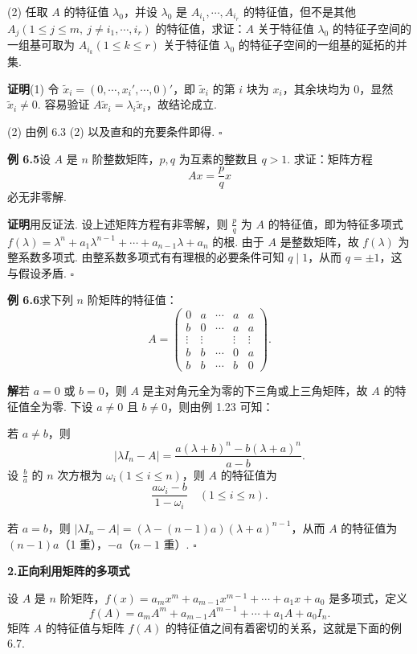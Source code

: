 \documentclass[UTF8,12pt,a4paper,fontset=fandol]{ctexart}
\begin{document}
(2) 任取 $A$ 的特征值 $\lambda_0$，并设 $\lambda_0$ 是 $A_{i_1},\cdots,A_{i_r}$ 的特征值，但不是其他 $A_j(1\le j\le m,\ j\ne i_1,\cdots,i_r)$ 的特征值，求证：$A$ 关于特征值 $\lambda_0$ 的特征子空间的一组基可取为 $A_{i_k}(1\le k\le r)$ 关于特征值 $\lambda_0$ 的特征子空间的一组基的延拓的并集.

\noindent\textbf{证明}\quad (1) 令 $\widetilde{x}_i=(0,\cdots,x_i',\cdots,0)'$，即 $\widetilde{x}_i$ 的第 $i$ 块为 $x_i$，其余块均为 $0$，显然 $\widetilde{x}_i\ne 0$. 容易验证 $A\widetilde{x}_i=\lambda_i\widetilde{x}_i$，故结论成立.

(2) 由例 6.3 (2) 以及直和的充要条件即得. $\square$

\noindent\textbf{例 6.5}\quad 设 $A$ 是 $n$ 阶整数矩阵，$p,q$ 为互素的整数且 $q>1$. 求证：矩阵方程
\[
Ax=\frac{p}{q}x
\]
必无非零解.

\noindent\textbf{证明}\quad 用反证法. 设上述矩阵方程有非零解，则 $\frac{p}{q}$ 为 $A$ 的特征值，即为特征多项式 $f(\lambda)=\lambda^n+a_1\lambda^{n-1}+\cdots+a_{n-1}\lambda+a_n$ 的根. 由于 $A$ 是整数矩阵，故 $f(\lambda)$ 为整系数多项式. 由整系数多项式有有理根的必要条件可知 $q\mid 1$，从而 $q=\pm 1$，这与假设矛盾. $\square$

\noindent\textbf{例 6.6}\quad 求下列 $n$ 阶矩阵的特征值：
\[
A=\left(\begin{array}{ccccc}
0 & a & \cdots & a & a\\
b & 0 & \cdots & a & a\\
\vdots & \vdots & & \vdots & \vdots\\
b & b & \cdots & 0 & a\\
b & b & \cdots & b & 0
\end{array}\right).
\]

\noindent\textbf{解}\quad 若 $a=0$ 或 $b=0$，则 $A$ 是主对角元全为零的下三角或上三角矩阵，故 $A$ 的特征值全为零. 下设 $a\ne 0$ 且 $b\ne 0$，则由例 1.23 可知：

若 $a\ne b$，则
\[
|\lambda I_n-A|=\frac{a(\lambda+b)^n-b(\lambda+a)^n}{a-b}.
\]
设 $\frac{b}{a}$ 的 $n$ 次方根为 $\omega_i(1\le i\le n)$，则 $A$ 的特征值为
\[
\frac{a\omega_i-b}{1-\omega_i}\quad (1\le i\le n).
\]

若 $a=b$，则 $|\lambda I_n-A|=(\lambda-(n-1)a)(\lambda+a)^{n-1}$，从而 $A$ 的特征值为 $(n-1)a$（1 重），$-a$（$n-1$ 重）. $\square$

\noindent\textbf{2.\quad 正向利用矩阵的多项式}

设 $A$ 是 $n$ 阶矩阵，$f(x)=a_mx^m+a_{m-1}x^{m-1}+\cdots+a_1x+a_0$ 是多项式，定义
\[
f(A)=a_mA^m+a_{m-1}A^{m-1}+\cdots+a_1A+a_0I_n.
\]
矩阵 $A$ 的特征值与矩阵 $f(A)$ 的特征值之间有着密切的关系，这就是下面的例 6.7.
\end{document}
